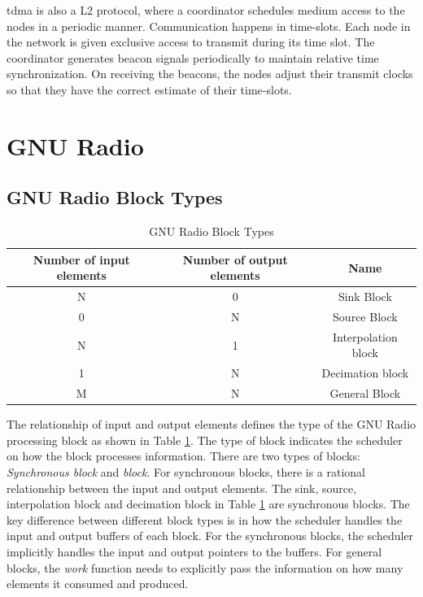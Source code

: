 \ac{tdma} is also a \ac{L2} protocol, where a coordinator schedules medium access to the nodes in a periodic manner.
Communication happens in time-slots.
Each node in the network is given exclusive access to transmit during its time slot.
The coordinator generates beacon signals periodically to maintain relative time synchronization. On receiving the beacons, the nodes adjust their transmit clocks so that they have the correct estimate of their time-slots.

\section{GNU Radio} \label{A.2}

\subsection{GNU Radio Block Types}
\begin{table}[h!]
\centering
\begin{tabular}{|c|c|c|}
\hline
Number of input elements & Number of output elements & Name\\
\hline
N & 0 & Sink Block\\
0 & N & Source Block\\
N & 1 & Interpolation block\\
1 & N & Decimation block\\
M & N & General Block\\
\hline
\end{tabular}
\caption{GNU Radio Block Types}
\label{block_type}
\end{table} 

The relationship of input and output elements defines the type of the GNU Radio processing block as shown in Table \ref{block_type}.
The type of block indicates the scheduler on how the block processes information.
There are two types of blocks: \textit{Synchronous block} and \textit{block}.
For synchronous blocks, there is a rational relationship between the input and output elements.
The sink, source, interpolation block and decimation block in Table \ref{block_type} are synchronous blocks.
The key difference between different block types is in how the scheduler handles the input and output buffers of each block.
For the synchronous blocks, the scheduler implicitly handles the input and output pointers to the buffers.
For general blocks, the \textit{work} function needs to explicitly pass the information on how many elements it consumed and produced.\\

